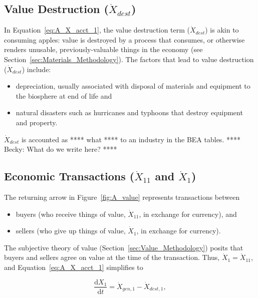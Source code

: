 \subsection{Value Destruction ($\dot{X}_{dest}$)}

\noindent In Equation~\ref{eq:A_X_acct_1}, 
the value destruction term ($\dot{X}_{dest}$) 
is akin to consuming apples: 
value is destroyed by a process that consumes, 
or otherwise renders unusable, 
previously-valuable things in the economy
(see Section~\ref{sec:Materials_Methodology}).
The factors that lead to value destruction
($\dot{X}_{dest}$) include:

\begin{itemize}
	\item{depreciation, usually associated with disposal of 
	materials and equipment to the biosphere at end of life and}
	\item{natural disasters such as hurricanes and typhoons
	that destroy equipment and property.}
\end{itemize}

$\dot{X}_{dest}$ is accounted as **** what **** to an industry in the BEA tables.
**** Becky: What do we write here? ****


\subsection{Economic Transactions ($\dot{X}_{11}$ and $\dot{X}_{1}$)}

The returning arrow in Figure~\ref{fig:A_value} 
represents transactions between 
\begin{itemize}
	\item{buyers (who receive things of value, $\dot{X}_{11}$,
	in exchange for currency), and}
	\item{sellers (who give up things of value, $\dot{X}_{1}$,
	in exchange for currency).}
\end{itemize}

The subjective theory of value
(Section~\ref{sec:Value_Methodology})
posits that buyers and sellers agree on value at the 
time of the transaction.
Thus, $\dot{X}_{1} = \dot{X}_{11}$, and Equation~\ref{eq:A_X_acct_1}
simplifies to

\begin{equation} \label{eq:A_X_acct_2}	
	\frac{\mathrm{d}X_{1}}{\mathrm{d}t}	
	= \dot{X}_{gen,1}
	- \dot{X}_{dest,1},
\end{equation}

